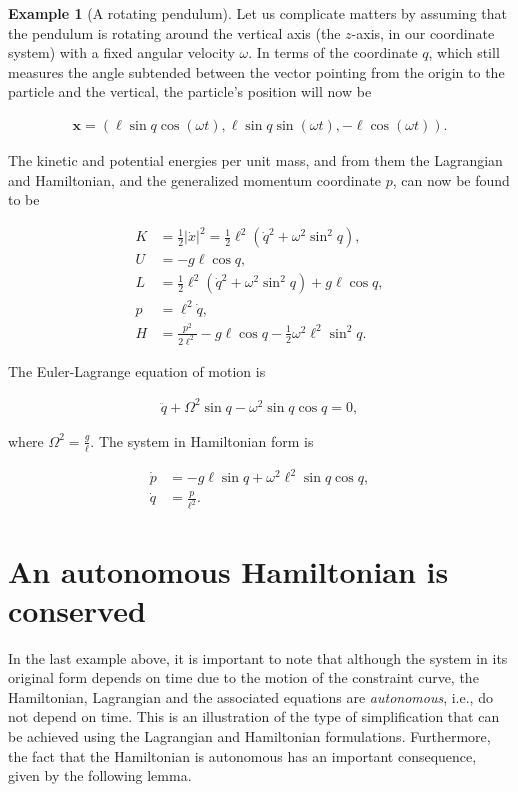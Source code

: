 \documentclass[11pt]{report}
\theoremstyle{plain}
\theoremstyle{definition}
\newtheorem{example}[thm]{Example}
\begin{document}
\begin{example}[A rotating pendulum]
Let us complicate matters by assuming that the
pendulum is rotating around the vertical axis (the
$z$-axis, in our coordinate system) with a fixed
angular velocity $\omega$. In terms of the coordinate
$q$, which still measures the angle subtended between
the vector pointing from the origin to the particle
and the vertical, the particle's position will now be

\begin{align*}
\mathbf{x} = (\ell \sin q \cos(\omega t), \ell \sin q \sin(\omega t), -\ell\cos(\omega t)).
\end{align*}

\noindent The kinetic and potential energies per unit mass, and
from them the Lagrangian and Hamiltonian, and the
generalized momentum coordinate $p$, can now be found
to be

\begin{align*}
K &= \tfrac12|\dot{x}|^2 = \tfrac12 \ell^2(\dot{q}^2 + \omega^2 \sin^2 q), \\
U &= -g\ell \cos q, \\
L &= \tfrac12\ell^2(\dot{q}^2+\omega^2\sin^2 q)+g\ell\cos q, \\
p &= \ell^2 \dot{q}, \\
H &= \frac{p^2}{2\ell^2}-g\ell\cos q-\tfrac12 \omega^2 \ell^2 \sin^2 q.
\end{align*}

\noindent The Euler-Lagrange equation of motion is

\begin{align*}
\ddot{q} + \Omega^2 \sin q - \omega^2 \sin q \cos q = 0,
\end{align*}

\noindent where $\Omega^2 = \frac{g}{\ell}$. The system in
Hamiltonian form is

\begin{align*}
\dot{p} &= -g\ell \sin q + \omega^2 \ell^2 \sin q \cos q, \\
\dot{q} &= \frac{p}{\ell^2}.
\end{align*}

\end{example}

\section{An autonomous Hamiltonian is conserved}

In the last example above, it is important to note
that although the system in its original form depends
on time due to the motion of the constraint curve, the
Hamiltonian, Lagrangian and the associated equations
are \emph{autonomous}, i.e., do not depend on time. This is
an illustration of the type of simplification that can
be achieved using the Lagrangian and Hamiltonian
formulations. Furthermore, the fact that the
Hamiltonian is autonomous has an important
consequence, given by the following lemma.
\end{document}
